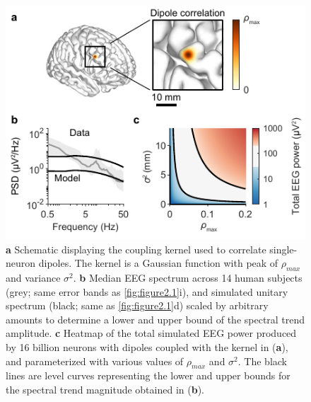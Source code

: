 \begin{figure}
  \begin{minipage}[c]{77mm}
    \includegraphics[width=\textwidth]{Figures/chapter2/figure2.pdf}
  \end{minipage}\hfill
  \begin{minipage}[c]{77mm}
    \caption{ 
	\textbf{a} Schematic displaying the coupling kernel used to correlate single-neuron dipoles. The kernel is a Gaussian function with peak of $\rho_{max}$ and variance $\sigma^2$.
	\textbf{b} Median EEG spectrum across 14 human subjects (grey; same error bands as \autoref{fig:figure2.1}i), and simulated unitary spectrum (black; same as \autoref{fig:figure2.1}d) scaled by arbitrary amounts to determine a lower and upper bound of the spectral trend amplitude. 
	\textbf{c} Heatmap of the total simulated EEG power produced by 16 billion neurons with dipoles coupled with the kernel in (\textbf{a}), and parameterized with various values of $\rho_{max}$ and $\sigma^2$. The black lines are level curves representing the lower and upper bounds for the spectral trend magnitude obtained in (\textbf{b}).
    } \label{fig:figure2.2}
  \end{minipage}
\end{figure}

